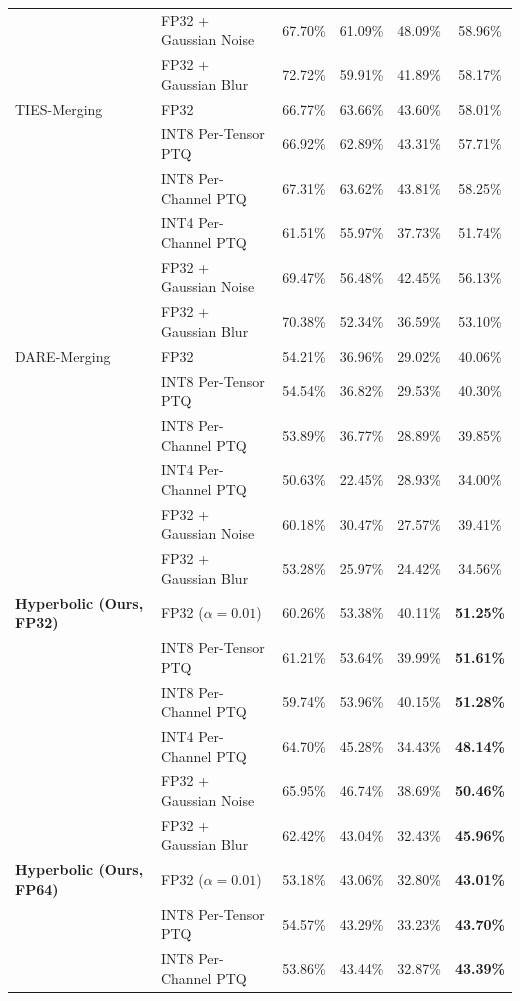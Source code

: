 \documentclass{article}
\theoremstyle{plain}
\theoremstyle{definition}
\theoremstyle{remark}
\begin{document}
\begin{table}[h]
\begin{center}
\begin{small}
\begin{tabular}{llcccc}
& FP32 + Gaussian Noise & 67.70\% & 61.09\% & 48.09\% & 58.96\% \\
& FP32 + Gaussian Blur & 72.72\% & 59.91\% & 41.89\% & 58.17\% \\
\midrule
TIES-Merging & FP32 & 66.77\% & 63.66\% & 43.60\% & 58.01\% \\
& INT8 Per-Tensor PTQ & 66.92\% & 62.89\% & 43.31\% & 57.71\% \\
& INT8 Per-Channel PTQ & 67.31\% & 63.62\% & 43.81\% & 58.25\% \\
& INT4 Per-Channel PTQ & 61.51\% & 55.97\% & 37.73\% & 51.74\% \\
& FP32 + Gaussian Noise & 69.47\% & 56.48\% & 42.45\% & 56.13\% \\
& FP32 + Gaussian Blur & 70.38\% & 52.34\% & 36.59\% & 53.10\% \\
\midrule
DARE-Merging & FP32 & 54.21\% & 36.96\% & 29.02\% & 40.06\% \\
& INT8 Per-Tensor PTQ & 54.54\% & 36.82\% & 29.53\% & 40.30\% \\
& INT8 Per-Channel PTQ & 53.89\% & 36.77\% & 28.89\% & 39.85\% \\
& INT4 Per-Channel PTQ & 50.63\% & 22.45\% & 28.93\% & 34.00\% \\
& FP32 + Gaussian Noise & 60.18\% & 30.47\% & 27.57\% & 39.41\% \\
& FP32 + Gaussian Blur & 53.28\% & 25.97\% & 24.42\% & 34.56\% \\
\midrule
\textbf{Hyperbolic (Ours, FP32)} & FP32 ($\alpha = 0.01$) & 60.26\% & 53.38\% & 40.11\% & \textbf{51.25\%} \\
& INT8 Per-Tensor PTQ & 61.21\% & 53.64\% & 39.99\% & \textbf{51.61\%} \\
& INT8 Per-Channel PTQ & 59.74\% & 53.96\% & 40.15\% & \textbf{51.28\%} \\
& INT4 Per-Channel PTQ & 64.70\% & 45.28\% & 34.43\% & \textbf{48.14\%} \\
& FP32 + Gaussian Noise & 65.95\% & 46.74\% & 38.69\% & \textbf{50.46\%} \\
& FP32 + Gaussian Blur & 62.42\% & 43.04\% & 32.43\% & \textbf{45.96\%} \\
\midrule
\textbf{Hyperbolic (Ours, FP64)} & FP32 ($\alpha = 0.01$) & 53.18\% & 43.06\% & 32.80\% & \textbf{43.01\%} \\
& INT8 Per-Tensor PTQ & 54.57\% & 43.29\% & 33.23\% & \textbf{43.70\%} \\
& INT8 Per-Channel PTQ & 53.86\% & 43.44\% & 32.87\% & \textbf{43.39\%} \\

\end{tabular}
\end{small}
\end{center}
\end{table}
\end{document}
